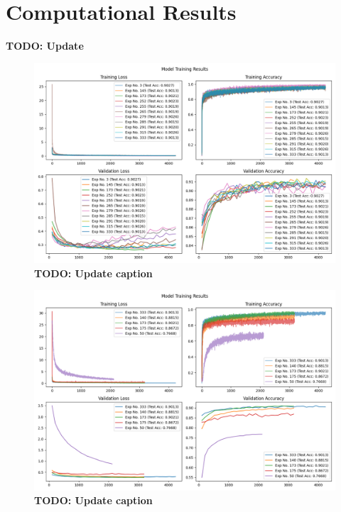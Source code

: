 \documentclass[11pt]{amsart}
\begin{document}
\section{Computational Results}\label{sec:results}

\textbf{TODO: Update}


\begin{figure}[h]
	\centering
	\includegraphics[width=.9\textwidth]{../visualizations/model_training_results_vis.png}
 	\caption{\textbf{TODO: Update caption}}\label{fig:f0}
\end{figure}

\begin{figure}[h]
	\centering
	\includegraphics[width=.9\textwidth]{../visualizations/model_training_results_vis_0.png}
 	\caption{\textbf{TODO: Update caption}}\label{fig:f1}
\end{figure}
\end{document}
